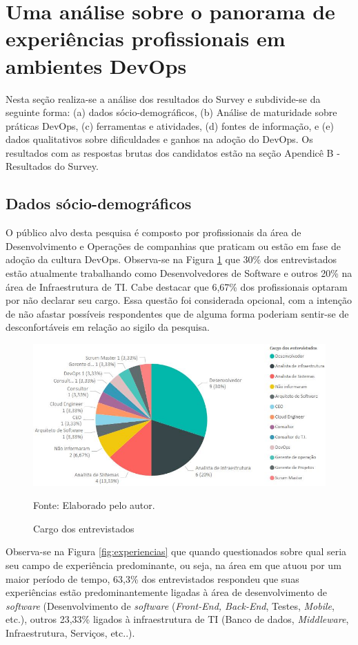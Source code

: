 \documentclass[twoside,english,brazilian]{UNISINOSartigo}
\newcommand{\source}[1]{\caption*{Fonte: {#1}} }
\begin{document}
\section{Uma análise sobre o panorama de experiências profissionais em ambientes DevOps}
Nesta seção realiza-se a análise dos resultados do Survey e subdivide-se da seguinte forma: (a) dados sócio-demográficos, (b) Análise de maturidade sobre práticas DevOps, (c) ferramentas e atividades, (d) fontes de informação, e (e) dados qualitativos sobre dificuldades e ganhos na adoção do DevOps.
Os resultados com as respostas brutas dos candidatos estão na seção Apendicê B - Resultados do Survey.

\subsection{Dados sócio-demográficos}
O público alvo desta pesquisa é composto por profissionais da área de Desenvolvimento e Operações de companhias que praticam ou estão em fase de adoção da cultura DevOps. Observa-se na Figura \ref{fig:cargos} que 30\% dos entrevistados estão atualmente trabalhando como Desenvolvedores de Software e outros 20\% na área de Infraestrutura de TI.  Cabe destacar que 6,67\% dos profissionais optaram por não declarar seu cargo. Essa questão foi considerada opcional, com a intenção de não afastar possíveis respondentes que de alguma forma poderiam sentir-se de desconfortáveis em relação ao sigilo da pesquisa. 
\begin{figure}[H]
    \centering
    \caption{Cargo dos entrevistados}
       \includegraphics[scale=.6]{imagens/cargos_pbi.JPG}
       \source{Elaborado pelo autor.}
    \label{fig:cargos}
\end{figure}
Observa-se na Figura \ref{fig:experiencias} que quando questionados sobre qual seria seu campo de experiência predominante, ou seja, na área em que atuou por um maior período de tempo, 63,3\% dos entrevistados respondeu que suas experiências estão predominantemente ligadas à área de desenvolvimento de \textit{software} (Desenvolvimento de \textit{software} (\textit{Front-End, Back-End}, Testes, \textit{Mobile}, etc.), outros 23,33\% ligados à infraestrutura de TI (Banco de dados, \textit{Middleware}, Infraestrutura, Serviços, etc..).
\end{document}
